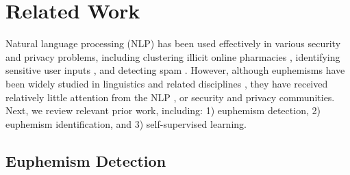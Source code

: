 
\section{Related Work}
\label{sec:related_work}
Natural language processing (NLP) 
has been used effectively in various security and privacy problems, including clustering illicit online pharmacies \cite{leontiadis2011measuring,mccoy2012pharmaleaks}, identifying sensitive user inputs \cite{huang2015supor,nan2015uipicker}, and detecting spam \cite{thomas2013trafficking,sedhai2017semi,wu2018twitter,wu2017twitter}. 
However, although euphemisms have been widely studied in linguistics and related disciplines  \cite{keith1991euphemism,pfaff1997metaphor,hugh2002rawson,allan2009connotations,rababah2014translatability,spears1981slang,chilton1987metaphor,ahl2006motivation,fernandez2006language}, they have  received relatively little attention from the NLP \cite{felt2020recognizing}, or security and privacy communities. 
Next, we review relevant prior work, including: 1) euphemism detection, %
2) euphemism identification, and 3) self-supervised learning. %


\subsection{Euphemism Detection}
\label{sec:related_det}

